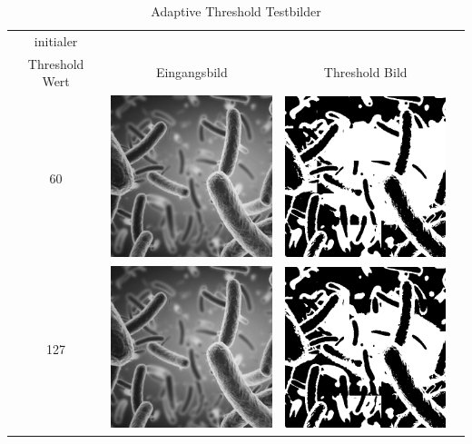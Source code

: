 \documentclass[12pt,german]{article}
\begin{document}
\begin{table}[H]
  \centering
  \begin{tabular}{| c | c | c | c | }
    \hline
   initialer \\Threshold Wert & Eingangsbild &  Threshold Bild \\
    \hline
     60 & \includegraphics[width=5cm]{../Bilddaten/bacteria.png} &   \includegraphics[width=5cm]{../Bilddaten/bacteria-01.png}\\
\hline
 127 & \includegraphics[width=5cm]{../Bilddaten/bacteria.png} &     \includegraphics[width=5cm]{../Bilddaten/bacteria-02.png} \\
\hline
     
  \end{tabular}
  \caption{Adaptive Threshold Testbilder}
\end{table}


\end{document}
